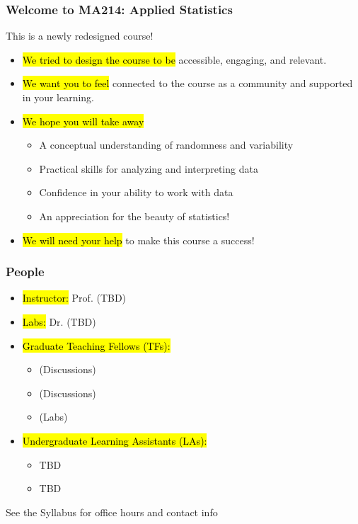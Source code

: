 \documentclass[slidestop,compress,mathserif]{beamer}
\begin{document}
\begin{frame}
	\frametitle{Welcome to MA214: Applied Statistics}
	This is a newly redesigned course!
	\begin{itemize}
		\item \hl{We tried to design the course to be} accessible, engaging, and relevant.
		\item \hl{We want you to feel} connected to the course as a community and supported in your learning.
		\item \hl{We hope you will take away}
		\begin{itemize}
			\item A conceptual understanding of randomness and variability
			\item Practical skills for analyzing and interpreting data
			\item Confidence in your ability to work with data
			\item An appreciation for the beauty of statistics!
		\end{itemize}
		\item \hl{We will need your help} to make this course a success!
	\end{itemize}
\end{frame}



\begin{frame}
	\frametitle{People}
	\begin{itemize}
		\item \hl{Instructor:} Prof. (TBD)
		\item \hl{Labs:} Dr. (TBD) 
		\item \hl{Graduate Teaching Fellows (TFs):} 
		\begin{itemize}
			\item  (Discussions)
			\item  (Discussions)
			\item  (Labs)
		\end{itemize}
		\item \hl{Undergraduate Learning Assistants (LAs):}
		\begin{itemize}
			\item TBD
			\item TBD
		\end{itemize}
	\end{itemize}
	See the Syllabus for office hours and contact info
\end{frame}
\end{document}
